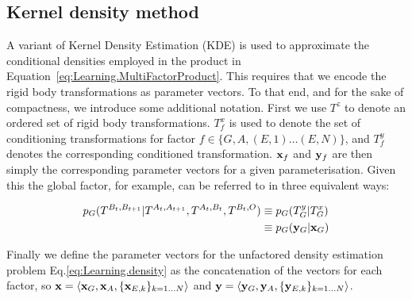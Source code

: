 \subsection{Kernel density method}\label{sec:Implementation.kde}

A variant of Kernel Density Estimation (KDE) \cite{scott2004multi-dimensional} is used to approximate the conditional densities employed in the product in Equation~\eqref{eq:Learning.MultiFactorProduct}. This requires that we encode the rigid body transformations as parameter vectors. To that end, and for the sake of compactness, we introduce some additional notation. First we use $T^z$ to denote an ordered set of rigid body transformations. $T^x_f$ is used to denote the set of conditioning transformations for factor $f \in \{G, A, (E,1) \ldots (E,N)\}$, and $T^y_f$ denotes the corresponding conditioned transformation. $\mathbf{x}_f$ and $\mathbf{y}_f$ are then simply the corresponding parameter vectors for a given parameterisation. Given this the global factor, for example, can be  referred to in three equivalent ways:

\begin{eqnarray*}
p_G(T^{B_{t}, B_{t+1}}|T^{A_{t}, A_{t+1}}, T^{A_t, B_t}, T^{B_t, O}) & \equiv p_G(T^y_G|T^x_G)  \\
& \equiv p_G(\mathbf{y}_G|\mathbf{x}_G)
\end{eqnarray*}

Finally we define the parameter vectors for the unfactored density estimation problem Eq.\eqref{eq:Learning.density} as the concatenation of the vectors for each factor, so $\mathbf{x}= \langle \mathbf{x}_G, \mathbf{x}_A, \{\mathbf{x}_{E,k}\}_{k = 1 \ldots N} \rangle$ and $\mathbf{y} = \langle \mathbf{y}_G, \mathbf{y}_A, \{\mathbf{y}_{E,k}\}_{k = 1 \ldots N} \rangle$.

